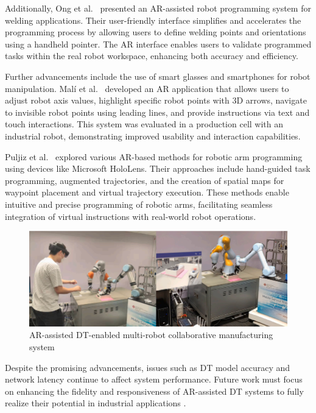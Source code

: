 \begin{enumerate}
    Additionally, Ong et al.~\cite{ong2020} presented an AR-assisted robot programming system for welding applications. Their user-friendly interface 
    simplifies and accelerates the programming process by allowing users to define welding points and orientations using a handheld pointer. 
    The \ac{AR} interface enables users to validate programmed tasks within the real robot workspace, enhancing both accuracy and efficiency.
    
    Further advancements include the use of smart glasses and smartphones for robot manipulation. Malí et al.~\cite{7819154} developed an \ac{AR} 
    application that allows users to adjust robot axis values, highlight specific robot points with 3D arrows, navigate to invisible robot points using
    leading lines, and provide instructions via text and touch interactions. This system was evaluated in a production cell with an industrial robot, 
    demonstrating improved usability and interaction capabilities.

    Puljiz et al.~\cite{puljiz2019conceptsendtoendaugmentedreality,puljiz2} explored various AR-based methods for robotic arm programming using devices like Microsoft HoloLens. 
    Their approaches include hand-guided task programming, augmented trajectories, and the creation of spatial maps for waypoint placement and virtual 
    trajectory execution. These methods enable intuitive and precise programming of robotic arms, facilitating seamless integration of virtual instructions 
    with real-world robot operations.
    
    \begin{figure}[h]
        \centering
        \includegraphics[width=0.8\linewidth]{figs/physical-digital.png}
        \caption{\ac{AR}-assisted \ac{DT}-enabled multi-robot collaborative manufacturing system \cite{LI2022102321}}
        \label{fig:physical-digital}
    \end{figure}
    
    Despite the promising advancements, issues such as \ac{DT} model accuracy and network latency continue to affect system performance. Future work must 
    focus on enhancing the fidelity and responsiveness of \ac{AR}-assisted \ac{DT} systems to fully realize their potential in industrial applications 
    \cite{LI2022102321}.
\end{enumerate}



